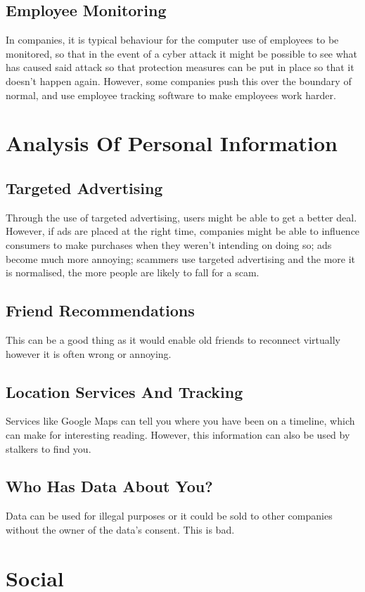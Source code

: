 \documentclass[a4paper,11pt, twocolumn]{article}
\begin{document}
\subsection{Employee Monitoring}
In companies, it is typical behaviour for the computer use of employees to be monitored, so that in the event of a cyber attack it might be possible to see what has caused said attack so that protection measures can be put in place so that it doesn't happen again. However, some companies push this over the boundary of normal, and use employee tracking software to make employees work harder.

\section{Analysis Of Personal Information}
\subsection{Targeted Advertising}
Through the use of targeted advertising, users might be able to get a better deal. However, if ads are placed at the right time, companies might be able to influence consumers to make purchases when they weren't intending on doing so; ads become much more annoying; scammers use targeted advertising and the more it is normalised, the more people are likely to fall for a scam.
\subsection{Friend Recommendations}
This can be a good thing as it would enable old friends to reconnect virtually however it is often wrong or annoying.
\subsection{Location Services And Tracking}
Services like Google Maps can tell you where you have been on a timeline, which can make for interesting reading. However, this information can also be used by stalkers to find you.
\subsection{Who Has Data About You?}
Data can be used for illegal purposes or it could be sold to other companies without the owner of the data's consent. This is bad.

\section{Social}
\end{document}
